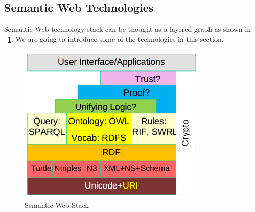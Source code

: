 \subsection{Semantic Web Technologies}

Semantic Web technology stack can be thought as a layered graph as shown in ~\ref{fig:SemanticWebStack}. We are going to introduce some of the technologies in this section.

\clearpage

\begin{figure}[ht!]
\centering
\includegraphics[width=90mm]{images/semantic-web-stack.png}
\caption{Semantic Web Stack\protect\footnotemark}
\label{fig:SemanticWebStack}
\end{figure}


